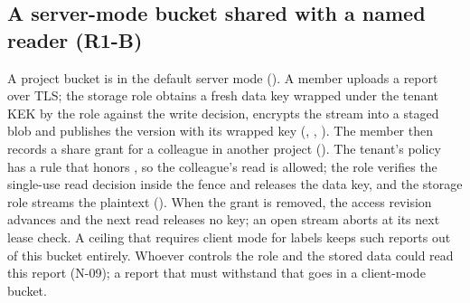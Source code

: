 \subsection{A server-mode bucket shared with a named reader (R1-B)}
A project bucket is in the default server mode (). A member uploads a report over TLS; the storage role obtains a fresh data key wrapped under the tenant KEK by the  role against the write decision, encrypts the stream into a staged blob and publishes the version with its wrapped key (, , ). The member then records a share grant for a colleague in another project (). The tenant's policy has a rule that honors , so the colleague's read is allowed; the  role verifies the single-use read decision inside the fence and releases the data key, and the storage role streams the plaintext (). When the grant is removed, the access revision advances and the next read releases no key; an open stream aborts at its next lease check. A ceiling that requires client mode for  labels keeps such reports out of this bucket entirely. Whoever controls the  role and the stored data could read this report (N-09); a report that must withstand that goes in a client-mode bucket.
